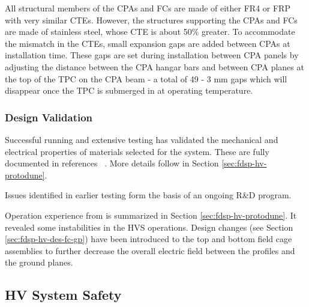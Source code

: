 All structural members of the CPAs and FCs are made of either FR4 or FRP with very similar CTEs. However, the structures supporting the CPAs and FCs are made of stainless steel, whose CTE is about 50\% greater.  To accommodate the mismatch in the CTEs, small expansion gaps are added between CPAs at installation time. These gaps are set during installation between CPA panels by adjusting the distance between the CPA hangar bars and between CPA planes at the top of the TPC on the CPA beam - a total of 49 - 3 mm gaps which will disappear once the TPC is submerged in \lar at operating temperature.
 
\subsubsection{Design Validation}

Successful  running and extensive testing has %
validated the mechanical and electrical properties of materials selected for the  system.  These are fully documented in references ~\cite{bib:docdb2338, bib:docdb1504, bib:docdb1601}. More details follow in Section \ref{sec:fdsp-hv-protodune}.

Issues identified in earlier testing form the basis of an ongoing R\&D program. 


Operation experience from  is summarized in Section \ref{sec:fdsp-hv-protodune}. It revealed some instabilities in the HVS operations.  Design changes (see Section \ref{sec:fdsp-hv-des-fc-gp}) have been introduced to the top and bottom field cage assemblies to further decrease the overall electric field between the profiles and the ground planes.


\subsection{HV System Safety}
\label{fdsp-hv-design-safety}


